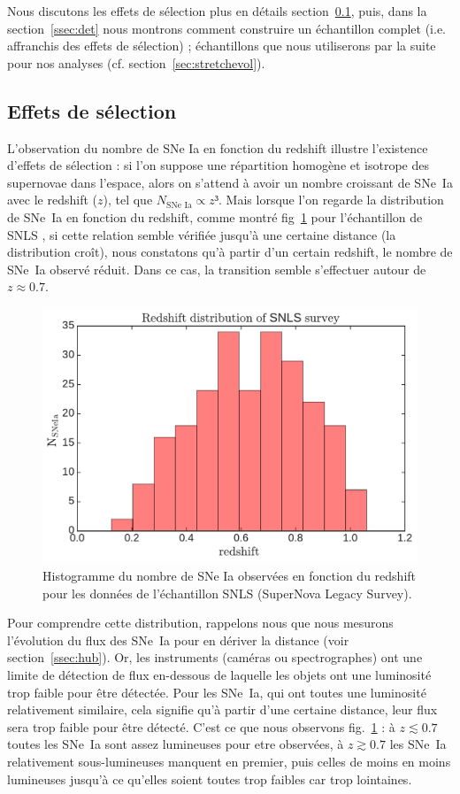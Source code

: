 \documentclass[a4paper, 12pt, svgnames]{article}
\begin{document}
Nous discutons les effets de sélection plus en détails
section~\ref{ssec:selec}, puis, dans la section~\ref{ssec:det} nous montrons
comment construire un échantillon complet (i.e. affranchis des effets de
sélection) ; échantillons que nous utiliserons par la suite pour nos analyses
(cf. section~\ref{sec:stretchevol}).

\subsection{Effets de sélection}\label{ssec:selec}

L'observation du nombre de SNe Ia en fonction du redshift illustre l'existence
d'effets de sélection : si l'on suppose une répartition homogène et isotrope des
supernovae dans l'espace, alors on s'attend à avoir un nombre croissant de
SNe~Ia avec le redshift ($z$), tel que $N_{\text{SNe~Ia}} \propto z³$. Mais
lorsque l'on regarde la distribution de SNe~Ia en fonction du redshift, comme
montré fig~\ref{fig:redshift_miss} pour l'échantillon de SNLS
\cite{astier_supernova_2006, betoule_improved_2014}, si cette relation semble
vérifiée jusqu'à une certaine distance (la distribution croît), nous constatons
qu'à partir d'un certain redshift, le nombre de SNe~Ia observé réduit. Dans ce
cas, la transition semble s'effectuer autour de $z\approx0.7$. \bigbreak

\begin{figure}[htbp!]
    \centering
    \includegraphics[width=.6\linewidth]{Rapport_figures/dist_SNLS.pdf}
    \captionsetup{justification=centering}
    \caption{Histogramme du nombre de SNe Ia observées en fonction du redshift
    pour les données de l'échantillon SNLS (SuperNova Legacy Survey).}
    \label{fig:redshift_miss}
\end{figure}

Pour comprendre cette distribution, rappelons nous que nous mesurons l'évolution
du flux des SNe~Ia pour en dériver la distance (voir section~\ref{ssec:hub}).
Or, les instruments (caméras ou spectrographes) ont une limite de détection de
flux en-dessous de laquelle les objets ont une luminosité trop faible pour être
détectée. Pour les SNe~Ia, qui ont toutes une luminosité relativement similaire, cela signifie qu'à partir d'une certaine distance, leur flux sera trop faible
pour être détecté. C'est ce que nous observons fig.~\ref{fig:redshift_miss} : à
$z\lesssim0.7$ toutes les SNe~Ia sont assez lumineuses pour etre observées, à
$z\gtrsim 0.7$ les SNe~Ia relativement sous-lumineuses manquent en premier, puis
celles de moins en moins lumineuses jusqu'à ce qu'elles soient toutes trop
faibles car trop lointaines. \bigbreak
\end{document}
